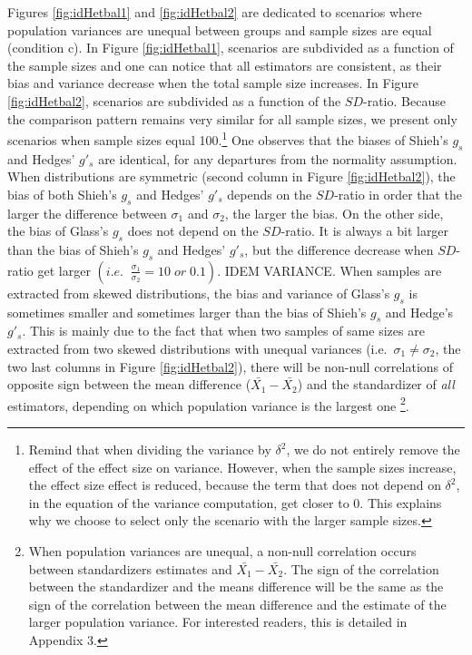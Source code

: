 \documentclass[
  man,floatsintext]{apa6}
\begin{document}
Figures \ref{fig:idHetbal1} and \ref{fig:idHetbal2} are dedicated to scenarios where population variances are unequal between groups and sample sizes are equal (condition c). In Figure \ref{fig:idHetbal1}, scenarios are subdivided as a function of the sample sizes and one can notice that all estimators are consistent, as their bias and variance decrease when the total sample size increases. In Figure \ref{fig:idHetbal2}, scenarios are subdivided as a function of the \(SD\)-ratio. Because the comparison pattern remains very similar for all sample sizes, we present only scenarios when sample sizes equal 100.\footnote{Remind that when dividing the variance by $\delta^2$, we do not entirely remove the effect of the effect size on variance. However, when the sample sizes increase, the effect size effect is reduced, because the term that does not depend on $\delta^2$, in the equation of the variance computation, get closer to 0. This explains why we choose to select only the scenario with the larger sample sizes.} One observes that the biases of Shieh's \(g_s\) and Hedges' \(g'_s\) are identical, for any departures from the normality assumption. When distributions are symmetric (second column in Figure \ref{fig:idHetbal2}), the bias of both Shieh's \(g_s\) and Hedges' \(g'_s\) depends on the \(SD\)-ratio in order that the larger the difference between \(\sigma_1\) and \(\sigma_2\), the larger the bias. On the other side, the bias of Glass's \(g_s\) does not depend on the \(SD\)-ratio. It is always a bit larger than the bias of Shieh's \(g_s\) and Hedges' \(g'_s\), but the difference decrease when \(SD\)-ratio get larger \(\left(i.e. \; \;\frac{\sigma_1}{\sigma_2} = 10 \; or \; 0.1\right)\). IDEM VARIANCE. When samples are extracted from skewed distributions, the bias and variance of Glass's \(g_s\) is sometimes smaller and sometimes larger than the bias of Shieh's \(g_s\) and Hedge's \(g'_s\). This is mainly due to the fact that when two samples of same sizes are extracted from two skewed distributions with unequal variances (i.e.~\(\sigma_1 \neq\sigma_2\), the two last columns in Figure \ref{fig:idHetbal2}), there will be non-null correlations of opposite sign between the mean difference (\(\bar{X_1}-\bar{X_2}\)) and the standardizer of \emph{all} estimators, depending on which population variance is the largest one \footnote{When population variances are unequal, a non-null correlation occurs between standardizers estimates and $\bar{X_1}-\bar{X_2}$. The sign of the correlation between the standardizer and the means difference will be the same as the sign of the correlation between the mean difference and the estimate of the larger population variance. For interested readers, this is detailed in Appendix 3.}.
\end{document}
